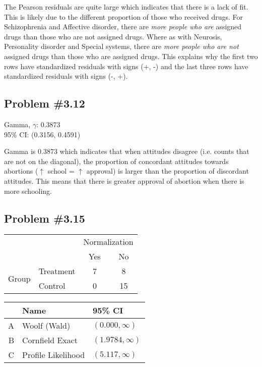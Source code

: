 \documentclass[12pt, letterpaper]{article}
\begin{document}
The Pearson residuals are quite large which indicates that there is a lack of fit.  This is likely due to the different proportion of those who received drugs.  For Schizophrenia and Affective disorder, there are\textit{ more people who are} assigned drugs than those who are not assigned drugs.  Where as with Neurosis, Personality disorder and Special systems, there are \textit{more people who are not} assigned drugs than those who are assigned drugs.  This explains why the first two rows have standardized residuals with signs (+, -) and the last three rows have standardized residuals with signs (-, +).  

\subsection*{Problem {\#}3.12}
Gamma, $\gamma$: 0.3873 \\
95\% CI: (0.3156, 0.4591)

Gamma is 0.3873 which indicates that when attitudes disagree (i.e. counts that are not on the diagonal), the proportion of concordant attitudes towards abortions ($\uparrow$ school = $\uparrow$ approval) is larger than the proportion of discordant attitudes.  This means that there is greater approval of abortion when there is more schooling.  

\subsection*{Problem {\#}3.15}

\begin{tabular}{c l cc }
	&			& \multicolumn{2}{c}{Normalization} \\
	&			& Yes	& No	\\ \cline{3-4} 
	\multirow{2}{*}{Group} & Treatment	& \multicolumn{1}{|c}{7}	& \multicolumn{1}{|c|}{8}\\ \cline{3-4} 
	& Control							& \multicolumn{1}{|c}{0}	& \multicolumn{1}{|c|}{15} \\ \cline{3-4}
\end{tabular} 
\hfill 
	\begin{tabular}{rll}
		\hline
		& Name  & 95\% CI  \\	\hline
		A & Woolf (Wald) & $(0.000, \infty) $ \\
		B & Cornfield Exact & $(1.9784, \infty)$ \\
		C & Profile Likelihood & $(5.117, \infty)$  \\ 
		\hline
	\end{tabular} 
\hfill 
\phant \\
\end{document}
